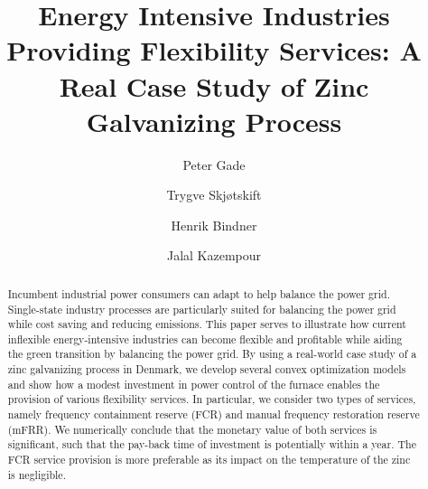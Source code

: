 \documentclass[sigconf]{acmart}
\begin{document}
\title{Energy Intensive Industries Providing Flexibility Services: A Real Case Study of Zinc Galvanizing Process}


\author{Peter Gade}

\author{Trygve Skj{\o}tskift}

\author{Henrik Bindner}

\author{Jalal Kazempour}

\renewcommand{\shortauthors}{Gade et al.}

\begin{abstract}
    Incumbent industrial power consumers can adapt to help balance the power grid. Single-state industry processes are particularly suited for balancing the power grid while cost saving and reducing emissions. This paper serves to illustrate how current inflexible energy-intensive industries can become flexible and profitable while aiding the green transition by balancing the power grid. By using a real-world case study of a zinc galvanizing process in Denmark, we develop several convex optimization models and show how a modest investment in power control of the furnace enables the provision of various flexibility services. In particular, we consider two types of services, namely frequency containment reserve (FCR) and manual frequency restoration reserve (mFRR). We numerically conclude that the monetary value of both services is significant, such that the pay-back time of investment is potentially within a year. The FCR service provision is more preferable as its impact on the temperature of the zinc is negligible.
\end{abstract}
\end{document}
